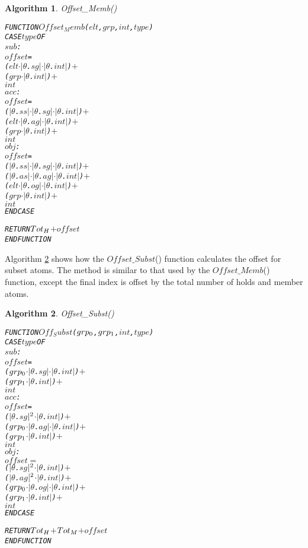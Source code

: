 \documentclass[11pt]{report}
\newenvironment{vverbatim}
{
  \begin{alltt}
}
{
    \vspace{-\baselineskip}
  \end{alltt}
}
\newtheorem{vvalgorithm}{Algorithm}[chapter]
\newenvironment{valgorithm}[2]
{
  \begin{vvalgorithm}{#1}
    \label{#2}
    \small
    \begin{vverbatim}
}
{
    \end{vverbatim}
  \end{vvalgorithm}
}
\begin{document}
        \begin{valgorithm}{Offset\_Memb()}{algo-impln-offme}
FUNCTION \(Offset_Memb\)(\(elt\), \(grp\), \(int\), \(type\))
  CASE \(type\) OF
    \(sub\) :
      \(offset\) =
        (\(elt\) \(\cdot\) \(|\)\(\theta\).\(sg\)\(|\) \(\cdot\) \(|\)\(\theta\).\(int\)\(|\)) \(+\)
        (\(grp\) \(\cdot\) \(|\)\(\theta\).\(int\)\(|\)) \(+\)
        \(int\)
    \(acc\) :
      \(offset\) =
        (\(|\)\(\theta\).\(ss\)\(|\) \(\cdot\) \(|\)\(\theta\).\(sg\)\(|\) \(\cdot\) \(|\)\(\theta\).\(int\)\(|\)) \(+\)
        (\(elt\) \(\cdot\) \(|\)\(\theta\).\(ag\)\(|\) \(\cdot\) \(|\)\(\theta\).\(int\)\(|\)) \(+\)
        (\(grp\) \(\cdot\) \(|\)\(\theta\).\(int\)\(|\)) \(+\)
        \(int\)
    \(obj\) :
      \(offset\) =
        (\(|\)\(\theta\).\(ss\)\(|\) \(\cdot\) \(|\)\(\theta\).\(sg\)\(|\) \(\cdot\) \(|\)\(\theta\).\(int\)\(|\)) \(+\)
        (\(|\)\(\theta\).\(as\)\(|\) \(\cdot\) \(|\)\(\theta\).\(ag\)\(|\) \(\cdot\) \(|\)\(\theta\).\(int\)\(|\)) \(+\)
        (\(elt\) \(\cdot\) \(|\)\(\theta\).\(og\)\(|\) \(\cdot\) \(|\)\(\theta\).\(int\)\(|\)) \(+\)
        (\(grp\) \(\cdot\) \(|\)\(\theta\).\(int\)\(|\)) \(+\)
        \(int\)
  ENDCASE

  RETURN \(Tot\sb{H}\) \(+\) \(offset\)
ENDFUNCTION
        \end{valgorithm}

        Algorithm \ref{algo-impln-offsu} shows how the $Offset\_Subst$()
        function calculates the offset for subset atoms. The method is
        similar to that used by the $Offset\_Memb$() function, except the
        final index is offset by the total number of holds and member atoms.

        \begin{valgorithm}{Offset\_Subst()}{algo-impln-offsu}
FUNCTION \(Off_Subst\)(\(grp\sb{0}\), \(grp\sb{1}\), \(int\), \(type\))
  CASE \(type\) OF
    \(sub\) :
      \(offset\) =
        (\(grp\sb{0}\) \(\cdot\) \(|\)\(\theta\).\(sg\)\(|\) \(\cdot\) \(|\)\(\theta\).\(int\)\(|\)) \(+\)
        (\(grp\sb{1}\) \(\cdot\) \(|\)\(\theta\).\(int\)\(|\)) \(+\)
        \(int\)
    \(acc\) :
      \(offset\) =
        (\(|\)\(\theta\).\(sg\)\(|\sp{2}\) \(\cdot\) \(|\)\(\theta\).\(int\)\(|\)) \(+\)
        (\(grp\sb{0}\) \(\cdot\) \(|\)\(\theta\).\(ag\)\(|\) \(\cdot\) \(|\)\(\theta\).\(int\)\(|\)) \(+\)
        (\(grp\sb{1}\) \(\cdot\) \(|\)\(\theta\).\(int\)\(|\)) \(+\)
        \(int\)
    \(obj\) :
      \(offset\) \(=\)
        (\(|\)\(\theta\).\(sg\)\(|\sp{2}\) \(\cdot\) \(|\)\(\theta\).\(int\)\(|\)) \(+\)
        (\(|\)\(\theta\).\(ag\)\(|\sp{2}\) \(\cdot\) \(|\)\(\theta\).\(int\)\(|\)) \(+\)
        (\(grp\sb{0}\) \(\cdot\) \(|\)\(\theta\).\(og\)\(|\) \(\cdot\) \(|\)\(\theta\).\(int\)\(|\)) \(+\)
        (\(grp\sb{1}\) \(\cdot\) \(|\)\(\theta\).\(int\)\(|\)) \(+\)
        \(int\)
  ENDCASE

  RETURN \(Tot\sb{H}\) \(+\) \(Tot\sb{M}\) \(+\) \(offset\)
ENDFUNCTION
        \end{valgorithm}
\end{document}
